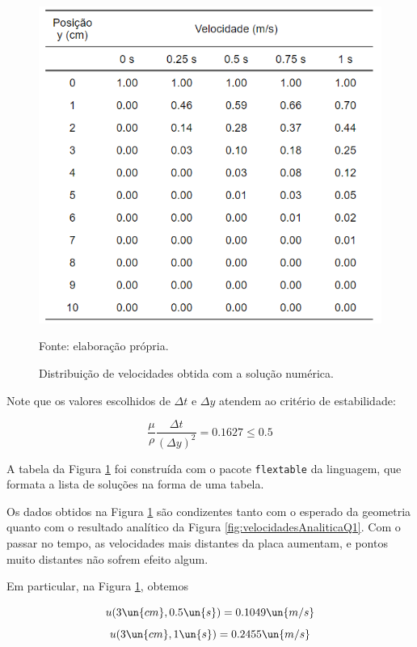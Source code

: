 \begin{figure}[h!]
    \caption{Distribuição de velocidades obtida com a solução numérica.}
    \label{fig:tabelaNumericaQ1}
    \centering
    \centerline{\includegraphics[scale=0.75]{tabelaNumericaQ1.png}}
    \par{Fonte: elaboração própria.}
\end{figure}

Note que os valores escolhidos de $\Delta t$ e $\Delta y$ atendem ao critério de estabilidade:

\[ \frac{\mu}{\rho} \frac{\Delta t}{\left(\Delta y\right)^2} = 0.1627 \leq 0.5 \]

A tabela da Figura \ref*{fig:tabelaNumericaQ1} foi construída com o pacote  \verb|flextable| da linguagem,
que formata a lista de soluções na forma de uma tabela.  

Os dados obtidos na Figura \ref*{fig:tabelaNumericaQ1} são condizentes tanto com o esperado da geometria
quanto com o resultado analítico da Figura \eqref{fig:velocidadesAnaliticaQ1}. Com o passar no tempo,
as velocidades mais distantes da placa aumentam, e pontos muito distantes não sofrem efeito 
algum.

Em particular, na Figura \ref*{fig:tabelaNumericaQ1}, obtemos 

\[ u(3 \un{cm}, 0.5 \un{s}) = 0.1049 \un{m/s} \]
\[ u(3 \un{cm}, 1 \un{s}) = 0.2455 \un{m/s} \]

